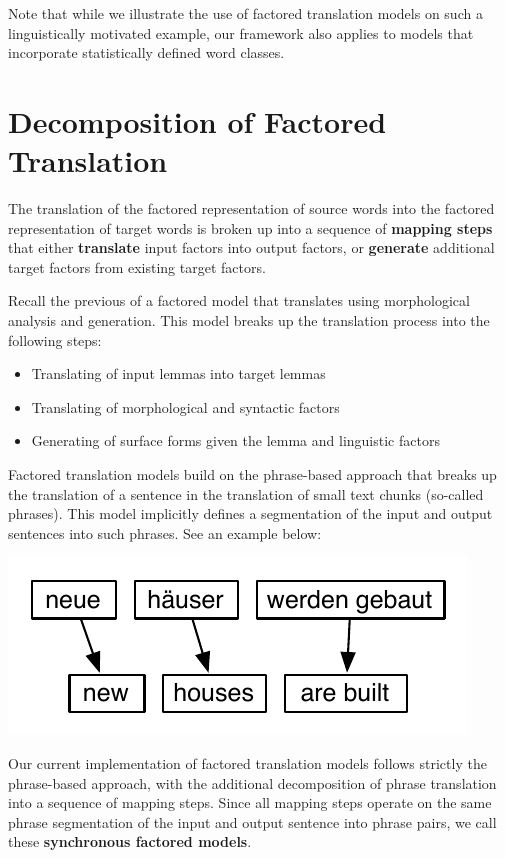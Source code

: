 \documentclass[11pt]{book}
\theoremstyle{plain}
\begin{document}
Note that while we illustrate the use of factored translation models on such a linguistically motivated example, our framework also applies to models that incorporate statistically defined word classes.

\section{Decomposition of Factored Translation}\label{sec:factored-decomposition}
The translation of the factored representation of source words into the factored representation of target words is broken up into a sequence of {\bf mapping steps} that either {\bf translate} input factors into output factors, or {\bf generate} additional target factors from existing target factors.

Recall the previous  of a factored model that translates using morphological analysis and generation. This model breaks up the translation process into the following steps:
\begin{itemize}
\item Translating of input lemmas into target lemmas
\item Translating of morphological and syntactic factors
\item Generating of surface forms given the lemma and linguistic factors
\end{itemize}

Factored translation models build on the phrase-based approach that breaks up the translation of a sentence in the translation of small text chunks (so-called phrases). This model implicitly defines a segmentation of the input and output sentences into such phrases. See an example below:

\begin{center}
\includegraphics[scale=1]{phrase-model-houses.pdf}
\end{center}

Our current implementation of factored translation models follows strictly the phrase-based approach, with the additional decomposition of phrase translation into a sequence of mapping steps. Since all mapping steps operate on the same phrase segmentation of the input and output sentence into phrase pairs, we call these {\bf synchronous factored models}. 
\end{document}
